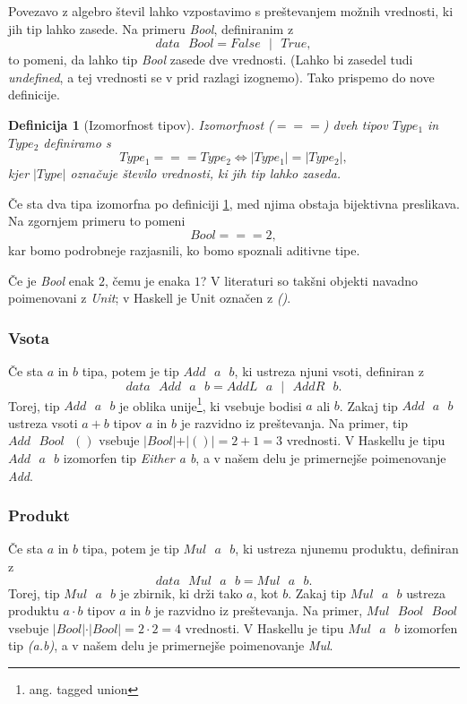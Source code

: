 \documentclass[a4paper, 12pt]{book}
\newtheorem{definicija}{Definicija}[chapter]
\begin{document}
Povezavo z algebro števil lahko vzpostavimo s preštevanjem možnih vrednosti, ki jih tip lahko zasede. Na primeru \emph{Bool}, definiranim z
$$data\text{ }Bool = False\text{ }\vert \text{ }True,$$
to pomeni, da lahko tip \emph{Bool} zasede dve vrednosti. (Lahko bi zasedel tudi \emph{undefined}, a tej vrednosti se v prid razlagi izognemo). Tako prispemo do nove definicije.
\begin{definicija}[Izomorfnost tipov]\label{def:iso}
Izomorfnost ($===$) dveh tipov $Type_1$ in $Type_2$ definiramo s
$$Type_1===Type_2 \iff \vert Type_1\vert = \vert Type_2\vert,$$
kjer $\vert Type\vert$ označuje število vrednosti, ki jih tip lahko zaseda.
\end{definicija}
Če sta dva tipa izomorfna po definiciji \ref{def:iso}, med njima obstaja bijektivna preslikava. Na zgornjem primeru to pomeni
$$Bool === 2,$$
kar bomo podrobneje razjasnili, ko bomo spoznali aditivne tipe.

Če je \emph{Bool} enak $2$, čemu je enaka $1$? V literaturi so takšni objekti navadno poimenovani z \emph{Unit}; v Haskell je Unit označen z \emph{()}.

\subsubsection{Vsota}

Če sta $a$ in $b$ tipa, potem je tip $Add\text{ }a\text{ }b$, ki ustreza njuni vsoti, definiran z
$$data\text{ }Add\text{ }a\text{ }b=AddL\text{ }a\text{ }|\text{ }AddR\text{ }b.$$
Torej, tip $Add\text{ }a\text{ }b$ je oblika unije\footnote{ang. tagged union}, ki vsebuje bodisi $a$ ali $b$. Zakaj tip $Add\text{ }a\text{ }b$ ustreza vsoti $a+b$ tipov $a$ in $b$ je razvidno iz preštevanja. Na primer, tip $Add\text{ }Bool\text{ }()$ vsebuje $\vert Bool\vert+\vert ()\vert=2+1=3$ vrednosti. V Haskellu je tipu $Add\text{ }a\text{ }b$ izomorfen tip \emph{Either a b}, a v našem delu je primernejše poimenovanje \emph{Add}.

\subsubsection{Produkt}

Če sta $a$ in $b$ tipa, potem je tip $Mul\text{ }a\text{ }b$, ki ustreza njunemu produktu, definiran z
$$data\text{ }Mul\text{ }a\text{ }b=Mul\text{ }a\text{ }b.$$
Torej, tip $Mul\text{ }a\text{ }b$ je zbirnik, ki drži tako $a$, kot $b$. Zakaj tip $Mul\text{ }a\text{ }b$ ustreza produktu $a\cdot b$ tipov $a$ in $b$ je razvidno iz preštevanja. Na primer, $Mul\text{ }Bool\text{ }Bool$ vsebuje $\vert Bool\vert\cdot\vert Bool\vert=2\cdot 2=4$ vrednosti.  V Haskellu je tipu $Mul\text{ }a\text{ }b$ izomorfen tip \emph{(a.b)}, a v našem delu je primernejše poimenovanje \emph{Mul}.
\end{document}
